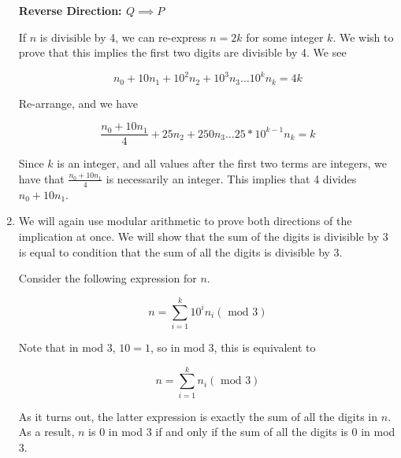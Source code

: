 \begin{solution}
\begin{enumerate}
\textbf{Reverse Direction: $Q \implies P$}

If $n$ is divisible by 4, we can re-express $n = 2k$ for some integer $k$. We
wish to prove that this implies the first two digits are divisible by 4. We see

$$n_0 + 10 n_1 + 10^2 n_2 + 10^3 n_3 \dots 10^k n_k = 4k$$

Re-arrange, and we have

$$\frac{n_0 + 10 n_1}{4} + 25 n_2 + 250 n_3 \dots 25 * 10^{k-1} n_k = k$$

Since $k$ is an integer, and all values after the first two terms are integers,
we have that $\frac{n_0 + 10 n_1}{4}$ is necessarily an integer. This
implies that 4 divides $n_0 + 10 n_1$.

\item We will again use modular arithmetic to prove both directions of the
implication at once. We will show that the sum of the digits is divisible by 3
is equal to condition that the sum of all the digits is divisible by 3.

Consider the following expression for $n$.

$$n = \sum_{i=1}^k 10^i n_i (\text{ mod } 3)$$

Note that in mod 3, $10 = 1$, so in mod 3, this is equivalent to

$$n = \sum_{i=1}^k n_i (\text{ mod } 3)$$

As it turns out, the latter expression is exactly the sum of all the digits
in $n$. As a result, $n$ is 0 in mod 3 if and only if the sum of all the
digits is 0 in mod 3.

\end{enumerate}
\end{solution}
